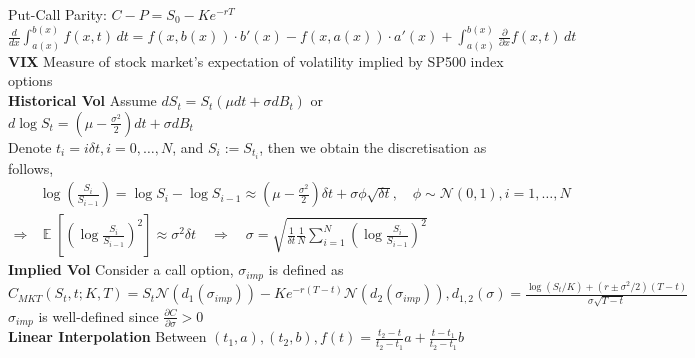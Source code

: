 \documentclass[12pt,landscape, a4paper]{article}
\theoremstyle{remark}
\newcommand{\E}{\operatorname{\mathbb{E}}}
\newcommand{\dd}{\partial}
\newcommand{\N}{\mathcal{N}}
\begin{document}
\setlength{\abovedisplayskip}{0pt}%
\setlength{\belowdisplayskip}{0pt}%
\setlength{\abovedisplayshortskip}{0pt}%
\setlength{\belowdisplayshortskip}{0pt}%
\setlength{\jot}{0pt}%


\raggedright
\tiny
\begin{multicols*}{3}
Put-Call Parity: $C - P = S_0 - Ke^{-rT}$
$\frac{d}{dx} \int_{a(x)}^{b(x)} f(x,t) \, dt = f(x, b(x)) \cdot b'(x) - f(x, a(x)) \cdot a'(x) + \int_{a(x)}^{b(x)} \frac{\partial}{\partial x} f(x,t) \, dt$\\

\textbf{VIX} Measure of stock market's expectation of volatility implied by SP500 index options\\
\textbf{Historical Vol} Assume $d S_t = S_t (\mu dt + \sigma d B_t)$ or $d \log S_t = \left(\mu - \frac{\sigma^2}{2} \right) dt + \sigma d B_t$\\
Denote $t_i = i \delta t, i=0, \dots, N$, and $S_i := S_{t_i}$, then we obtain the discretisation as follows,
\begin{align*}
    &\log \left(\frac{S_i}{S_{i-1}} \right) = \log S_i - \log S_{i-1} \approx \left(\mu -\frac{\sigma^2}{2}  \right) \delta t + \sigma \phi \sqrt{\delta t} ,\quad \phi \sim \N (0, 1), i = 1, \dots, N\\
    \Rightarrow& \E \left[ \left(\log \frac{S_i}{S_{i-1}} \right)^2 \right] \approx \sigma^2 \delta t \quad \Rightarrow \quad
    \sigma = \sqrt{\frac{1}{\delta t} \frac{1}{N} \sum^N_{i=1} \left(\log \frac{S_i}{S_{i-1}} \right)^2 }
\end{align*}
\textbf{Implied Vol} Consider a call option, $\sigma_{imp}$ is defined as $C_{MKT} (S_t, t; K, T) = S_t \N (d_1 (\sigma_{imp})) - K e^{-r (T-t) } \N (d_2 (\sigma_{imp})), d_{1, 2} (\sigma) = \frac{\log (S_t/K) + (r \pm \sigma^2/2) (T-t) }{\sigma \sqrt{T-t}}$\\
$\sigma_{imp}$ is well-defined since $\frac{\dd C}{\dd \sigma} > 0$\\

\textbf{Linear Interpolation} Between $(t_1, a), (t_2, b), f(t) = \frac{t_2 - t}{t_2 - t_1} a + \frac{t - t_1}{t_2 - t_1 } b$\\


\end{multicols*}
\end{document}
